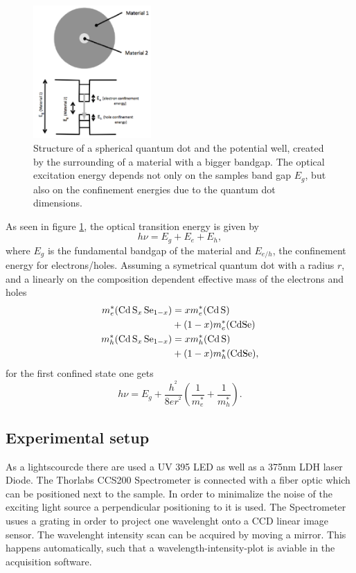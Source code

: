 \begin{figure}
  \centering
  \includegraphics[width=0.4\textwidth]{graphics/QD.png}
  \caption[width=0.4\textwidth]{Structure of a spherical quantum dot and the potential well, created by the surrounding of a material with a bigger bandgap. The optical excitation energy depends not only on the samples band gap $E_g$, but also on the confinement energies due to the quantum dot dimensions\cite{instruction}.}
  \label{fig:QD}
\end{figure}

As seen in figure \ref{fig:QD}, the optical transition energy is given by
\begin{equation}
    h \nu = E_g + E_e + E_h,
\end{equation}
where $E_g$ is the fundamental bandgap of the material and $E_{e/h}$, the confinement energy for electrons/holes.
Assuming a symetrical quantum dot with a radius $r$, and a linearly on the composition dependent effective mass of the electrons and holes
\begin{align*}
m_e^*(\ce{Cd S_x Se_{1-x}}) &= x m_e^*(\ce{Cd S}) \\ &+ (1-x)m_e^* (\ce{CdSe}) \\
m_h^*(\ce{Cd S_x Se_{1-x}}) &= x m_h^*(\ce{Cd S}) \\ &+ (1-x)m_h^* (\ce{CdSe}),
\end{align*}
for the first confined state one gets
\begin{equation}
    h \nu = E_g + \frac{h^^2}{8er^^2}(\frac{1}{m_e^*} + \frac{1}{m_h^*}).
\end{equation}

\subsection{Experimental setup}
\label{sec:setup}

As a lightscourcde there are used a UV 395 LED as well as a 375nm LDH laser Diode.
The Thorlabs CCS200 Spectrometer is connected with a fiber optic which can be positioned next to the sample. 
In order to minimalize the noise of the exciting light source a perpendicular positioning to it is used.
The Spectrometer usues a grating in order to project one wavelenght onto a CCD linear image sensor.
The wavelenght intensity scan can be acquired by moving a mirror. This happens automatically, such that a wavelength-intensity-plot is aviable in the acquisition software.

